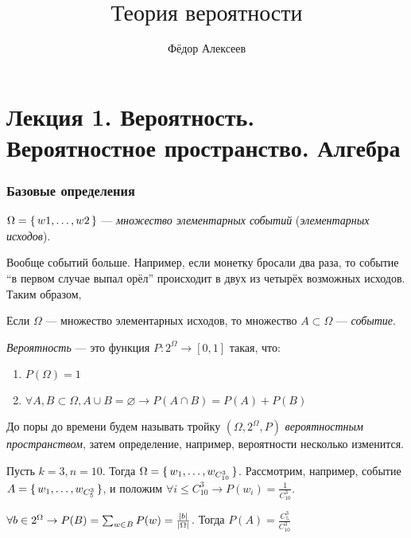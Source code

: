 



\title{$\mbox{Теория вероятности}$}
\author{Фёдор Алексеев}

\maketitle
\gitlink\tableofcontents

\part*{Лекция 1. Вероятность. Вероятностное пространство. Алгебра}

\section{Базовые определения}

\begin{define*}
  $\Omega = \set{w1, \ldots, w2}$ --- \emph{множество элементарных событий} (\emph{элементарных исходов}).
\end{define*}

Вообще событий больше. Например, если монетку бросали два раза, то событие ``в первом случае выпал орёл'' происходит в двух из 
четырёх возможных исходов. Таким образом,

\begin{define*}
  Если $\Omega$ --- множество элементарных исходов, то множество $A \subset \Omega$ --- \emph{событие}.
\end{define*}

\begin{define*}[Временное]
  \emph{Вероятность} --- это функция $P: 2^{\Omega} \to [0, 1]$ такая, что:
  \begin{enumerate}
	\item $P(\Omega) = 1$
	\item $\forall A, B \subset \Omega, A \cup B = \varnothing \to P(A\cap B) = P(A) + P(B)$
  \end{enumerate}
\end{define*}

\begin{define*}[Временное]
  До поры до времени будем называть тройку $(\Omega, 2^{\Omega}, P)$ \emph{вероятностным пространством}, затем определение, например,
  вероятности несколько изменится.
\end{define*}

\begin{example} $ $ \\
  Пусть $k = 3, n = 10$. Тогда $\Omega = \set{w_1, \ldots, w_{C_{10}^{3}}}$. 
  Рассмотрим, например, событие $A = \set{w_1, \ldots, w_{C_{5}^{3}}}$, и положим $\forall i \le C_{10}^{3} \to P(w_i) = \frac{1}{C_{10}^{3}}$.

  $\forall	b \in 2^{\Omega} \to P(B) = \sum_{w\in B} P(w) = \frac{\left\lvert b \right\rvert}{\left\lvert \Omega \right\rvert}$. Тогда $P(A) = \frac{C_{5}^{3}}{C_{10}^{3}}$
\end{example}

